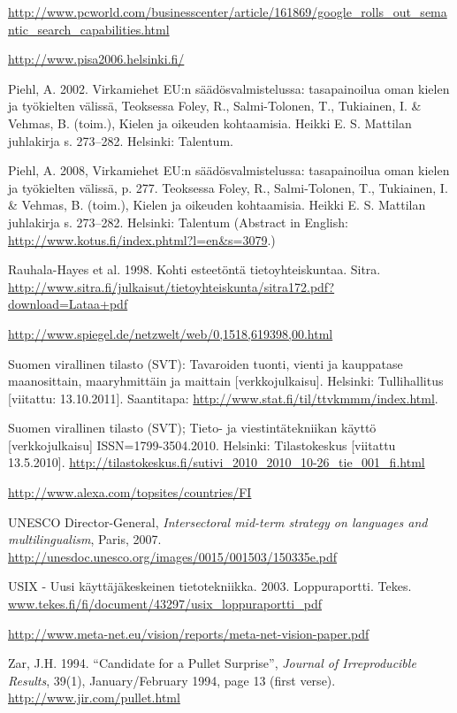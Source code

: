 \documentclass[]{../../metanetpaper}
\begin{document}
\begin{Parallel}[c]{70mm}{70mm}
\begin{thebibliography}{102}
\url{http://www.pcworld.com/businesscenter/article/161869/google_rolls_out_semantic_search_capabilities.html}

\url{http://www.pisa2006.helsinki.fi/}

Piehl, A. 2002. Virkamiehet EU:n säädösvalmistelussa: tasapainoilua oman
kielen ja työkielten välissä, Teoksessa Foley, R., Salmi-Tolonen, T.,
Tukiainen, I. \& Vehmas, B. (toim.), Kielen ja oikeuden kohtaamisia. Heikki E.
S. Mattilan juhlakirja s. 273–282. Helsinki: Talentum.

Piehl, A. 2008, Virkamiehet EU:n säädösvalmistelussa: tasapainoilua oman
kielen ja työkielten välissä, p. 277. Teoksessa Foley, R., Salmi-Tolonen, T.,
Tukiainen, I. \& Vehmas, B. (toim.), Kielen ja oikeuden kohtaamisia. Heikki E.
S. Mattilan juhlakirja s. 273–282. Helsinki: Talentum (Abstract in English:
\url{http://www.kotus.fi/index.phtml?l=en&s=3079}.)

Rauhala-Hayes et al. 1998. Kohti esteetöntä tietoyhteiskuntaa. Sitra.
\url{http://www.sitra.fi/julkaisut/tietoyhteiskunta/sitra172.pdf?download=Lataa+pdf}

\url{http://www.spiegel.de/netzwelt/web/0,1518,619398,00.html}

Suomen virallinen tilasto (SVT): Tavaroiden tuonti, vienti ja kauppatase
maanosittain, maaryhmittäin ja maittain [verkkojulkaisu]. Helsinki:
Tullihallitus [viitattu: 13.10.2011].
Saantitapa: \url{http://www.stat.fi/til/ttvkmmm/index.html}.

Suomen virallinen tilasto (SVT); Tieto- ja viestintätekniikan käyttö
[verkkojulkaisu] ISSN=1799-3504.2010. Helsinki: Tilastokeskus [viitattu
13.5.2010].
\url{http://tilastokeskus.fi/sutivi_2010_2010_10-26_tie_001_fi.html}

\url{http://www.alexa.com/topsites/countries/FI}

UNESCO Director-General,
\emph{Intersectoral mid-term strategy on languages and multilingualism},
Paris, 2007.
\url{http://unesdoc.unesco.org/images/0015/001503/150335e.pdf}

USIX - Uusi käyttäjäkeskeinen tietotekniikka. 2003. Loppuraportti. Tekes.
\url{www.tekes.fi/fi/document/43297/usix_loppuraportti_pdf}

\url{http://www.meta-net.eu/vision/reports/meta-net-vision-paper.pdf}

Zar, J.H. 1994. “Candidate for a Pullet Surprise”,
\emph{Journal of Irreproducible Results}, 39(1),
January/February 1994, page 13 (first verse).
\url{http://www.jir.com/pullet.html}

\end{thebibliography}

\clearpage

 \ParallelPar
 \end{Parallel}
\end{document}
